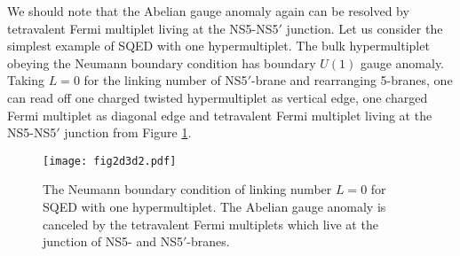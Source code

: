 \documentclass{article}
\numberwithin{equation}{section}
\begin{document}
We should note that the 
Abelian gauge anomaly again can be resolved by 
tetravalent Fermi multiplet living at the NS5-NS5$'$ junction. 
Let us consider the simplest example of SQED with one hypermultiplet. 
The bulk hypermultiplet obeying the Neumann boundary condition has boundary $U(1)$ gauge anomaly. 
Taking $L=0$ for the linking number of NS5$'$-brane 
and rearranging 5-branes, one can read off 
one charged twisted hypermultiplet as 
vertical edge, one charged Fermi multiplet as diagonal edge 
and tetravalent Fermi multiplet living at the NS5-NS5$'$ junction 
from Figure \ref{fig2d3d2}. 
\begin{figure}
\begin{center}
\texttt{[image: fig2d3d2.pdf]}
\caption{The Neumann boundary condition of linking number $L=0$ for SQED with one hypermultiplet. 
The Abelian gauge anomaly is canceled by the tetravalent Fermi multiplets 
which live at the junction of NS5- and NS5$'$-branes. }
\label{fig2d3d2}
\end{center}
\end{figure}
\end{document}
